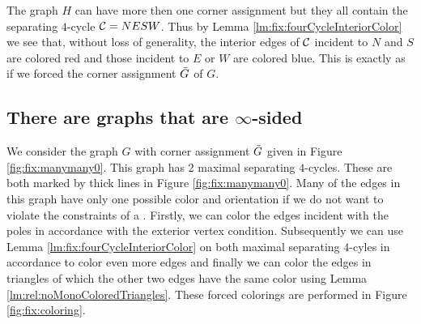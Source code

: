   The graph $H$ can have more then one corner assignment but they all contain the separating $4$-cycle $\mathcal{C}= NESW$. Thus by Lemma \ref{lm:fix:fourCycleInteriorColor} we see that, without loss of generality, the interior edges of $\mathcal{C}$ incident to $N$ and $S$ are colored red and those incident to $E$ or $W$ are colored blue. This is exactly as if we forced the corner assignment $\bar{G}$ of $G$. 


\subsection{There are graphs that are $\infty$-sided}
  \label{ss:fix:manymany}

  We consider the graph $G$ with corner assignment $\bar{G}$ given in Figure \ref{fig:fix:manymany0}. This graph has 2 maximal separating $4$-cycles. These are both marked by thick lines in Figure \ref{fig:fix:manymany0}.
  Many of the edges in this graph have only one possible color and orientation if we do not want to violate the constraints of a \rel. Firstly, we can color the edges incident with the poles in accordance with the exterior vertex condition. Subsequently we can use Lemma \ref{lm:fix:fourCycleInteriorColor} on both maximal separating $4$-cyles in accordance to color even more edges and finally we can color the edges in triangles of which the other two edges have  the same color using Lemma \ref{lm:rel:noMonoColoredTriangles}. These forced colorings are performed in Figure \ref{fig:fix:coloring}.

